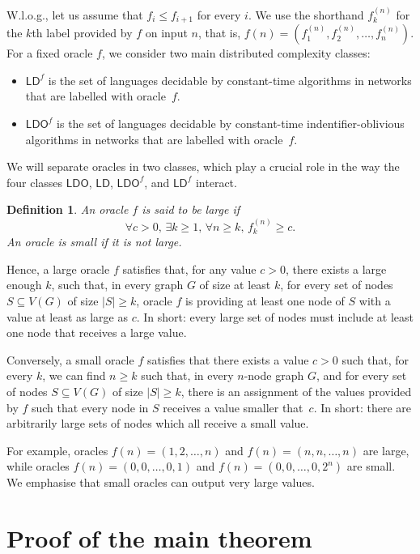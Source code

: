 \documentclass[11pt,a4paper]{article}
\theoremstyle{definition}
\newtheorem{definition}{Definition}
\theoremstyle{remark}
\newcommand{\ldo}{\mathsf{LDO}}
\newcommand{\ld}{\mathsf{LD}}
\begin{document}
W.l.o.g., let us assume that $f_i \le f_{i+1}$ for every $i$. We use the shorthand $f^{(n)}_k$ for the $k$th label provided by $f$ on input $n$, that is, $f(n) = (f^{(n)}_1, f^{(n)}_2, \dotsc, f^{(n)}_n)$. For a fixed oracle $f$, we consider two main distributed complexity classes: 
\begin{itemize}[noitemsep]
\item $\ld^f$ is the set of languages decidable by constant-time algorithms in networks that are labelled with oracle~$f$.
\item $\ldo^f$ is the set of languages decidable by constant-time indentifier-oblivious algorithms in networks that are labelled with oracle~$f$.
\end{itemize}
We will separate oracles in two classes, which play a crucial role in the way the four classes $\ldo$, $\ld$, $\ldo^f$, and $\ld^f$ interact.

\begin{definition}\em
An oracle $f$ is said to be \emph{large} if $$\forall c > 0,\, \exists k \geq 1,\, \forall n \ge k, \, f_k^{(n)} \ge c.$$ An oracle is \emph{small} if it is not large. 
\end{definition}

Hence, a large oracle $f$ satisfies that,  for any value $c > 0$, there exists a large enough $k$, such that, in every graph $G$ of size at least $k$, for every set of nodes $S\subseteq V(G)$ of size $|S|\geq k$, oracle $f$ is providing at least one node of $S$ with a value at least as large as $c$. In short: every large set of nodes must include at least one node that receives a large value. 

Conversely, a small oracle $f$ satisfies that there exists a value  $c>0$ such that, for every $k$, we can find $n\geq k$ such that, in every $n$-node graph $G$, and for every set of nodes $S\subseteq V(G)$ of size $|S|\geq k$, there is an assignment of the values provided by $f$ such that every node in $S$ receives a value smaller that~$c$.  In short: there are arbitrarily  large sets of nodes which all receive a small value. 

For example, oracles $f(n) = (1,2,\dotsc,n)$ and $f(n) = (n,n,\dotsc,n)$ are large, while oracles $f(n) = (0,0,\dotsc,0,1)$ and $f(n) = (0,0,\dotsc,0,2^n)$ are small. We emphasise that small oracles can output very large values.


\section{Proof of the main theorem}
\end{document}
